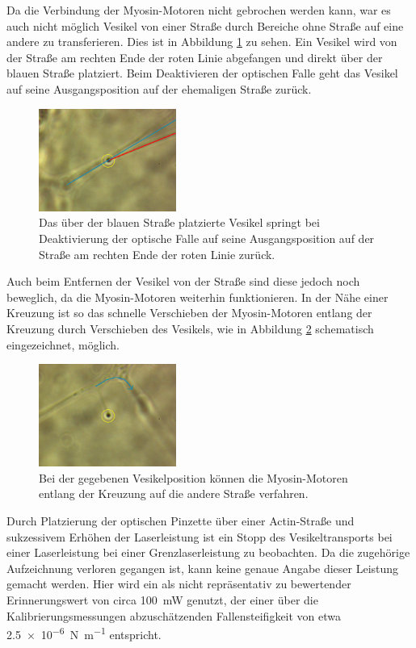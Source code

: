         \FloatBarrier 
        Da die Verbindung der Myosin-Motoren nicht gebrochen werden kann, war es auch nicht möglich Vesikel von einer Straße durch Bereiche ohne Straße auf eine andere zu transferieren. Dies ist in Abbildung
        \ref{fig:vesikel_overlap} zu sehen. Ein Vesikel wird von der Straße am rechten Ende der roten Linie abgefangen und direkt über der blauen Straße platziert. Beim Deaktivieren der optischen Falle geht das 
        Vesikel auf seine Ausgangsposition auf der ehemaligen Straße zurück.
        \FloatBarrier
        \begin{figure}[h]
        \centering
        \includegraphics[width = 0.4\textwidth]{pictures/vesikel_overlap.png}
        \caption{Das über der blauen Straße platzierte Vesikel springt bei Deaktivierung der optische Falle auf seine Ausgangsposition auf der Straße am rechten Ende der roten Linie zurück.}
        \label{fig:vesikel_overlap}
        \end{figure}
        \FloatBarrier 
        \newpage
        Auch beim Entfernen der Vesikel von der Straße sind diese jedoch noch beweglich, da die Myosin-Motoren weiterhin funktionieren. In der Nähe einer Kreuzung ist so das schnelle Verschieben der 
        Myosin-Motoren entlang der Kreuzung durch Verschieben des Vesikels, wie in Abbildung \ref{fig:vesikel_sprung} schematisch eingezeichnet, möglich.
        \FloatBarrier
        \begin{figure}[h]
        \centering
        \includegraphics[width = 0.4\textwidth]{pictures/vesikel_transport.png}
        \caption{Bei der gegebenen Vesikelposition können die Myosin-Motoren entlang der Kreuzung auf die andere Straße verfahren.}
        \label{fig:vesikel_sprung}
        \end{figure}
        \FloatBarrier 
        Durch Platzierung der optischen Pinzette über einer Actin-Straße und sukzessivem Erhöhen der Laserleistung ist ein Stopp des Vesikeltransports bei einer Laserleistung bei einer Grenzlaserleistung 
        zu beobachten. Da die zugehörige Aufzeichnung verloren gegangen ist, kann keine genaue Angabe dieser Leistung gemacht werden. Hier wird ein als nicht repräsentativ zu bewertender Erinnerungswert von 
        circa \SI{100}{\milli\watt} genutzt, der einer über die Kalibrierungsmessungen abzuschätzenden Fallensteifigkeit von etwa \SI{2.5e-6}{\newton\per\metre} entspricht. 